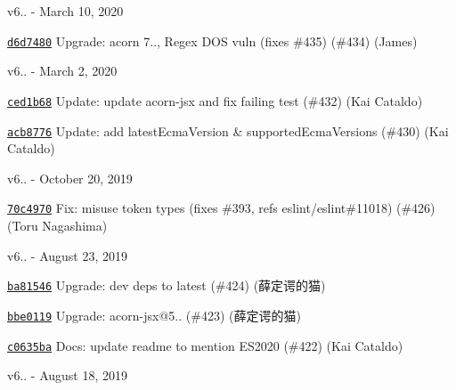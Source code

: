 v6.. -\/ March 10, 2020


\begin{DoxyItemize}
\item \href{https://github.com/eslint/espree/commit/d6d7480e424960159007caea86f209f696138734}{\texttt{ {\ttfamily d6d7480}}} Upgrade\+: acorn 7.., Regex D\+OS vuln (fixes \#435) (\#434) (James)
\end{DoxyItemize}

v6.. -\/ March 2, 2020


\begin{DoxyItemize}
\item \href{https://github.com/eslint/espree/commit/ced1b6810b991531e6d3788ebd5a322fc5c7d463}{\texttt{ {\ttfamily ced1b68}}} Update\+: update acorn-\/jsx and fix failing test (\#432) (Kai Cataldo)
\item \href{https://github.com/eslint/espree/commit/acb8776d369abf9e02f79142879e9b1a4774f938}{\texttt{ {\ttfamily acb8776}}} Update\+: add latest\+Ecma\+Version \& supported\+Ecma\+Versions (\#430) (Kai Cataldo)
\end{DoxyItemize}

v6.. -\/ October 20, 2019


\begin{DoxyItemize}
\item \href{https://github.com/eslint/espree/commit/70c4970e5eba6f060e1e32a22d231647f2d0e0f8}{\texttt{ {\ttfamily 70c4970}}} Fix\+: misuse token types (fixes \#393, refs eslint/eslint\#11018) (\#426) (Toru Nagashima)
\end{DoxyItemize}

v6.. -\/ August 23, 2019


\begin{DoxyItemize}
\item \href{https://github.com/eslint/espree/commit/ba81546e8552ec0f779aae7e03668c334630484e}{\texttt{ {\ttfamily ba81546}}} Upgrade\+: dev deps to latest (\#424) (薛定谔的猫)
\item \href{https://github.com/eslint/espree/commit/bbe01195fb57e24634d18825d39b820ed1767e95}{\texttt{ {\ttfamily bbe0119}}} Upgrade\+: acorn-\/jsx@5.. (\#423) (薛定谔的猫)
\item \href{https://github.com/eslint/espree/commit/c0635bac4cd891cb612fb81655012e2579f4e2b1}{\texttt{ {\ttfamily c0635ba}}} Docs\+: update readme to mention E\+S2020 (\#422) (Kai Cataldo)
\end{DoxyItemize}

v6.. -\/ August 18, 2019


